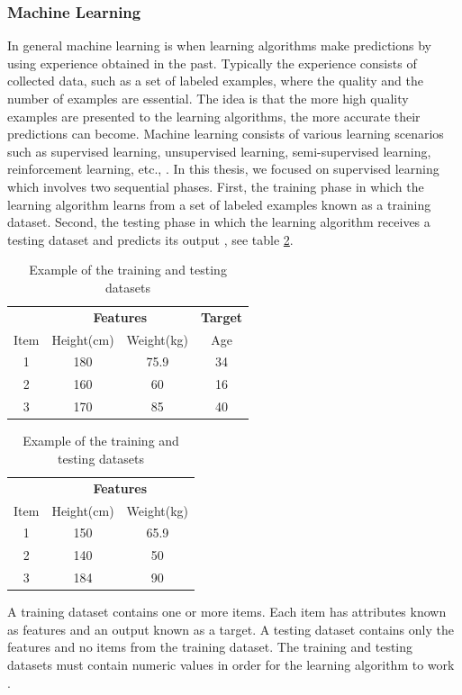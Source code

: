 \documentclass[a4paper,12pt]{article}
\begin{document}
\subsubsection{Machine Learning}
In general machine learning is when learning algorithms make predictions by using experience obtained in the past. Typically the experience consists of collected data, such as a set of labeled examples, where the quality and the number of examples are essential. The idea is that the more high quality examples are presented to the learning algorithms, the more accurate their predictions can become. Machine learning consists of various learning scenarios such as supervised learning, unsupervised learning, semi-supervised learning, reinforcement learning, etc., \cite{FOML-2012}. In this thesis, we focused on supervised learning which involves two sequential phases. First, the training phase in which the learning algorithm learns from a set of labeled examples known as a training dataset. Second, the testing phase in which the learning algorithm receives a testing dataset and predicts its output \cite{ML-2016}, see table \ref{ExampleDatasets}.
\begin{table}[H]
	\begin{subtable}{.5\linewidth}
		\centering
		\begin{tabular}{c|c|c|c}
			\hline
			\multicolumn{1}{c|}{} & \multicolumn{2}{c|}{\textbf{Features}} & \multicolumn{1}{c}{\textbf{Target}} \\
			\cline{1-3} \cline{3-4}
			Item & Height(cm) & Weight(kg) & Age \\
			\hline
			1 & 180 & 75.9 & 34 \\
			\hline
			2 & 160 & 60 &  16 \\
			\hline
			3 & 170 & 85 & 40 \\
			\hline
		\end{tabular}
		\caption{Training dataset}
	\end{subtable}
	\begin{subtable}{.5\linewidth}
		\centering
		\begin{tabular}{c|cc}
			\hline
			\multicolumn{1}{c|}{} & \multicolumn{2}{c}{\textbf{Features}} \\
			\cline{1-3}
			Item & Height(cm) & Weight(kg) \\
			\hline
			1 & 150 & 65.9 \\
			\hline
			2 & 140 & 50 \\
			\hline
			3 & 184 & 90 \\
			\hline
		\end{tabular}
		\caption{Testing dataset}
	\end{subtable} 
	\caption{Example of the training and testing datasets}
	\label{ExampleDatasets}
\end{table}
A training dataset contains one or more items. Each item has attributes known as features and an output known as a target. A testing dataset contains only the features and no items from the training dataset. The training and testing datasets must contain numeric values in order for the learning algorithm to work \cite{HOMLWSLATF-2017}.
\end{document}
